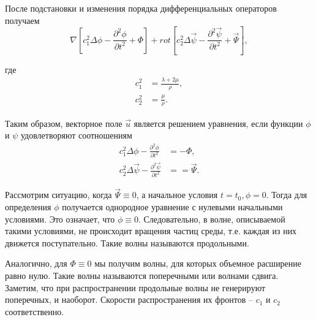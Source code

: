 После подстановки и изменения порядка дифференциальных операторов получаем
\begin{equation}
\nabla[c_1^2\Delta\phi - \frac{\partial^2 \phi}{\partial t^2} + \Phi] + rot[c_2^2\Delta\vec{\psi} - \frac{\partial^2 \vec{\psi}}{\partial t^2} + \vec{\Psi}],
\end{equation}

где 
\begin{align}
c_1^2 &= \frac{\lambda+2\mu}{\rho}, \nonumber\\
c_2^2 &= \frac{\mu}{\rho}.
\end{align}

Таким образом, векторное поле $\vec{u}$ является решением уравнения, если функции $\phi$ и $\psi$ удовлетворяют соотношениям
\begin{align}
c_1^2\Delta\phi - \frac{\partial^2 \phi}{\partial t^2} &= -\Phi, \\
c_2^2\Delta\vec{\psi} - \frac{\partial^2 \vec{\psi}}{\partial t^2} &= =\vec{\Psi}.
\end{align}

Рассмотрим ситуацию, когда $\vec{\Psi} \equiv 0$, а начальное условия $t = t_0, \phi = 0$. Тогда для определения $\phi$ получается однородное уравнение с нулевыми начальными условиями. Это означает, что $\phi \equiv 0$. Следовательно, в волне, описываемой такими условиями, не происходит вращения частиц среды, т.е. каждая из них движется поступательно. Такие волны называются продольными.

Аналогично, для $\Phi \equiv 0$ мы получим волны, для которых объемное расширение равно нулю. Такие волны называются поперечными или волнами сдвига. Заметим, что при распространении продольные волны не генерируют поперечных, и наоборот. Скорости распространения их фронтов -- $c_1$ и $c_2$ соответственно.



